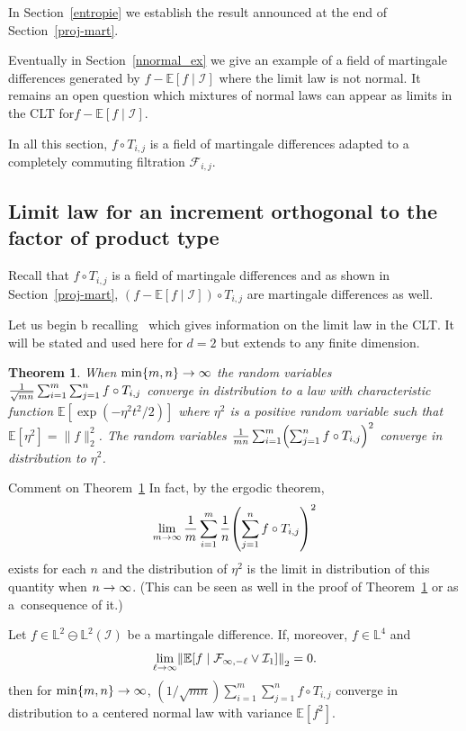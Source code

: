 \documentclass[10pt]{amsart}
\newtheorem{theo}{Theorem}[section]
\theoremstyle{definition}\newtheorem{defi}[theo]{Definition}\newtheorem{rema}[theo]{Remark}\newtheorem{exam}[theo]{Example}\newtheorem{exem}[theo]{Example}\newtheorem{nota}[theo]{Notation}
\newcommand*\bbL{\mathbb{L}}
\newcommand{\bbE}{\mathbb{E}}
\newcommand{\E}[1]{\bbE\left[#1\right]}
\newcommand*\I{\mathcal{I}}
\newcommand*\F{\mathcal{F}}
\newcommand{\norm}[1]{\left\lVert #1\right\rVert}
\renewcommand*{\to}{\mathchoice{\longrightarrow}{\rightarrow}{\rightarrow}{\rightarrow}}
\let\originalleft\left
\let\originalright\right
\renewcommand{\left}{\mathopen{}\mathclose\bgroup\originalleft}
\renewcommand{\right}{\aftergroup\egroup\originalright}
\newenvironment{enonce*}[2][]{\par\smallskip\noindent\textbf{#2.}\ }{\par\smallskip}
\begin{document}
In Section~\ref{entropie} we establish the result announced at the end of Section~\ref{proj-mart}.

Eventually in Section~\ref{nnormal_ex} we give an example of a field of martingale differences generated by $f - \bbE[f \mid \I]$ where the limit law is not normal. It remains an open question which mixtures of normal laws can appear as limits in the CLT for\linebreak $f - \bbE[f \mid \I]$.

In all this section, $f\circ T_{i,j}$ is a field of martingale differences adapted to a completely commuting filtration $\F_{i,j}$.

\subsection{Limit law for an increment orthogonal to the factor of product type}\label{queue-property}

Recall that $f\circ T_{i,j}$ is a field of martingale differences and as shown in Section~\ref{proj-mart}, $(f - \bbE[f \mid \I])\circ T_{i,j}$ are martingale differences as well.

Let us begin b recalling~\cite[Theorem~1]{MR3913270} which gives information on the limit law in the CLT. It will be stated and used here for $d=2$ but extends to any finite dimension.
\begin{theo}\label{thmdv}
When $\min\{m,n\}\to\infty$ the random variables $\frac1{\sqrt{mn}}\sum_{i=1}^m\sum_{j=1}^n \linebreak f\circ T_{i,j}$ converge in distribution to a law with characteristic function $\bbE[\exp(-\eta^2t^2/2)]$ where $\eta^2$ is a positive random variable such that $\bbE[\eta^2]=\|f\|_2^2$. The random variables $\frac1{mn}\sum_{i=1}^m\left(\sum_{j=1}^n f\circ T_{i,j}\right)^2$ converge in distribution to $\eta^2$.
\end{theo}

\begin{enonce*}[remark]{Comment on Theorem~\ref{thmdv}}
In fact, by the ergodic theorem,
\[
\lim_{m\to\infty}\frac1{m}\sum_{i=1}^m\frac1n\left(\sum_{j=1}^n f\circ
T_{i,j}\right)^2
\]
exists for each $n$ and the distribution of $\eta^2$ is the
limit in distribution of this quantity when $n\to\infty$. (This can be seen as well in the proof of Theorem~\ref{thmdv} or as a~consequence of it.)
\end{enonce*}
\begin{prop}\label{queue-condition}
Let $f\in \bbL^2\ominus \bbL^2(\I)$ be a martingale difference. If, moreover, $f\in\bbL^4$ and
\begin{equation}\label{eq:hyp_pour_avoir_loi_normale}
\lim_{\ell\to\infty}
\norm{
\E{f\mid\F_{\infty, -\ell}\vee \I_1 }}_2=0.
\end{equation}
then for $\min\{m,n\} \to\infty$, $(1/\sqrt{mn}) \sum_{i=1}^m\sum_{j=1}^n f\circ T_{i,j}$ converge in distribution to a centered normal law with variance $\bbE[f^2]$.
\end{prop}
\end{document}
